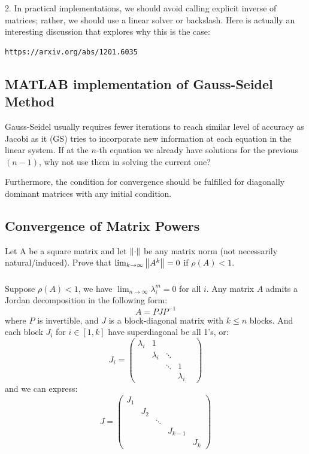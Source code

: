 \documentclass[12pt]{article} %
\newcommand{\ntoinf}[1]{\lim_{{#1}\rightarrow \infty}}
\newcommand{\1}[1]{\mathds{1}\left[#1\right]}
\begin{document}
2. In practical implementations, we should avoid calling explicit inverse of matrices; rather, we should use a linear solver or backslash. Here is actually an interesting discussion that explores why this is the case:
\begin{verbatim}
https://arxiv.org/abs/1201.6035
\end{verbatim}

\subsection{MATLAB implementation of Gauss-Seidel Method}
Gauss-Seidel usually requires fewer iterations to reach  similar level of accuracy as Jacobi as it (GS) tries to incorporate new information at each equation in the linear system. If at the $n$-th equation we already have solutions for the previous $(n-1)$, why not use them in solving the current one?

Furthermore, the condition for convergence should be fulfilled for diagonally dominant matrices with any initial condition.

\subsection{Convergence of Matrix Powers}
Let A be a square matrix and let $\norm{\cdot}$ be any matrix norm (not necessarily natural/induced). Prove that $\lim_{k\rightarrow \infty}\norm{A^k} = 0$ if $\rho(A) < 1$.

\subsubsection{}
Suppose $\rho(A)<1$, we have $\ntoinf{n}\lambda_{i}^m = 0$ for all $i$. Any matrix $A$ admits a Jordan decomposition in the following form:
$$
	A = PJP^{-1}
$$ where $P$ is invertible, and $J$ is a block-diagonal matrix with $k \le n$ blocks. And each block $J_i$ for $i\in[1,k]$ have superdiagonal be all 1's, or:
$$
	J_i 
	=
	\begin{pmatrix}
		\lambda_i & 1 & & \\
		& \lambda_i & \ddots & \\
		& & \ddots & 1& \\
		& & & \lambda_i
	\end{pmatrix}
$$ and we can express:
$$
	J = 
	\begin{pmatrix}
		J_1 & & & & \\
		& J_2 & & & \\
		& & \ddots & & \\
		& & & J_{k-1} & \\
		& & & & J_k
	\end{pmatrix}
$$
\end{document}
